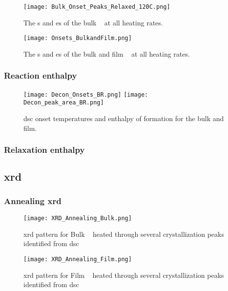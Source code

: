 \documentclass[draft,a4paper,12pt,oneside]{article}%
\begin{document}
\begin{figure}[b]
	\centering
	\texttt{[image: Bulk\_Onset\_Peaks\_Relaxed\_120C.png]}
	\caption[Table of contents Capition]{The \Tg s and \Tx es of the bulk \MgZnCa~ at all heating rates. }%
	\label{fig:DSC_Onsets_Bulk}
\end{figure}

\begin{figure}[b]
	\centering
	\texttt{[image: Onsets\_BulkandFilm.png]}
	\caption[Table of contents Capition]{The \Tg s and \Tx es of the bulk and film \MgZnCa~ at all heating rates. }%
	\label{fig:DSC_Onsets_BulkFilm}
\end{figure}

\subsubsection{Reaction enthalpy}

\begin{figure}[b]
	\centering
	\texttt{[image: Decon\_Onsets\_BR.png]}
	\medskip
	\texttt{[image: Decon\_peak\_area\_BR.png]}
	\caption{\acrshort{dsc} onset temperatures and enthalpy of formation for the bulk and film.}
	\label{fig:DSC_Decon}
\end{figure}

\subsubsection{Relaxation enthalpy}

\subsection{\acrshort{xrd}}
\subsubsection{Annealing \acrshort{xrd}}

\begin{figure}[b]
	\centering
	\texttt{[image: XRD\_Annealing\_Bulk.png]}
	\caption[Table of contents Capition]{\acrshort{xrd} pattern for Bulk \MgZnCa~ heated through several crystallization peaks identified from \acrshort{dsc}}
	\label{fig:XRD_Annealing_Bulk}
\end{figure}

\begin{figure}[b]
	\centering
	\texttt{[image: XRD\_Annealing\_Film.png]}
	\caption[Table of contents Capition]{\acrshort{xrd} pattern for Film \MgZnCa~ heated through several crystallization peaks identified from \acrshort{dsc}}
	\label{fig:XRD_Annealing_Film}
\end{figure}
\end{document}
